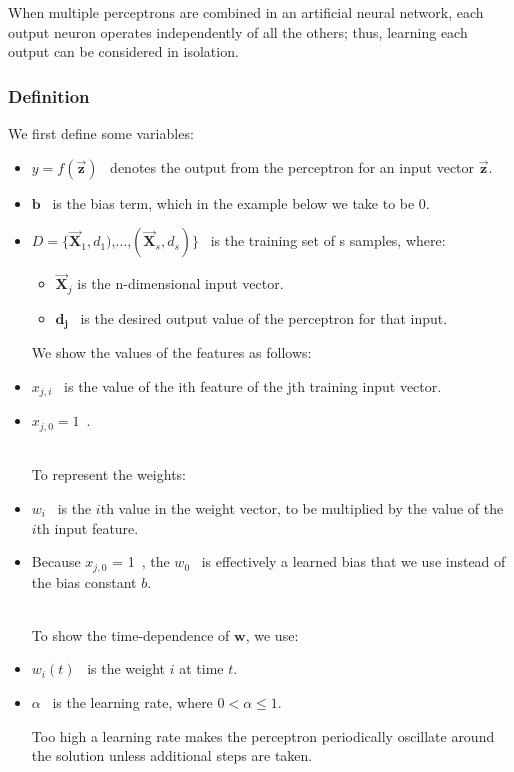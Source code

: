 \documentclass[12pt, right open]{memoir}
\begin{document}
When multiple perceptrons are combined in an artificial neural network, each output neuron operates independently of all the others; thus, learning each output can be considered in isolation.

\subsubsection{Definition}
We first define some variables:
\begin{itemize}
\item $y = f(\vec{\mathbf{z}})$ \, denotes the output from the perceptron for an input vector $\vec{\mathbf{z}}$.
\item $\mathbf{b}$ \, is the bias term, which in the example below we take to be 0.
\item $D = \{\vec{\mathbf{X}}_1,d_1)$,$\dots$,$(\vec{\mathbf{X}}_s,d_s)\}$ \, is the training set of s samples, where:
\begin{itemize}
\item $\vec{\mathbf{X}}_j$ is the n-dimensional input vector.
\item $\mathbf{d_j}$ \, is the desired output value of the perceptron for that input. \hfill \\
\end{itemize}

We show the values of the features as follows:
\item $x_{j,i}$ \, is the value of the ith feature of the jth training input vector.
\item $x_{j,0} = 1$ \,. 

\hfill \\ To represent the weights:
\item $w_i$ \, is the $i$th value in the weight vector, to be multiplied by the value of the $i$th input feature.
\item Because $x_{j,0}$ = 1 \,, the $w_0$ \, is effectively a learned bias that we use instead of the bias constant $b$.

\hfill \\ To show the time-dependence of $\mathbf{w}$, we use:
\item $w_i(t)$ \, is the weight $i$ at time $t$.
\item $\alpha$ \, is the learning rate, where $0 < \alpha \leq 1$.

Too high a learning rate makes the perceptron periodically oscillate around the solution unless additional steps are taken.
\end{itemize}
\end{document}
